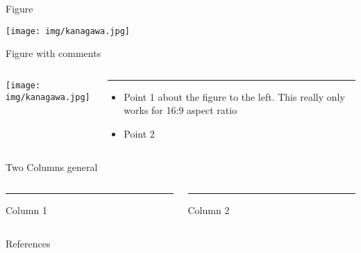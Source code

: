 \documentclass[aspectratio=43]{beamer}
\begin{document}

\begin{frame}{Figure}
    \begin{center}
        \texttt{[image: img/kanagawa.jpg]}
    \end{center}
\end{frame}

\begin{frame}{Figure with comments}
    \begin{columns}[T] %
    \begin{column}{.62\textwidth}
        \texttt{[image: img/kanagawa.jpg]}
    \end{column}%

    \begin{column}{.38\textwidth}
        {\color{accent}\rule{\linewidth}{3pt}}
        
        \begin{itemize}[leftmargin=0cm]
            \item Point 1 about the figure to the left. This really only works for 16:9 aspect ratio
            \item Point 2
        \end{itemize}
    \end{column}%
    \end{columns}
\end{frame}


\begin{frame}{Two Columns general}
    \begin{columns}[T] %
    \begin{column}{.50\textwidth}
        {\color{accent}\rule{\linewidth}{3pt}}
        Column 1
    \end{column}
    
    \hfill
    
    \begin{column}{.50\textwidth}
        {\color{accent}\rule{\linewidth}{3pt}}
        Column 2
    \end{column}
    \end{columns}
\end{frame}


\begin{frame}[allowframebreaks]{References}
    \printbibliography
\end{frame}
\end{document}
